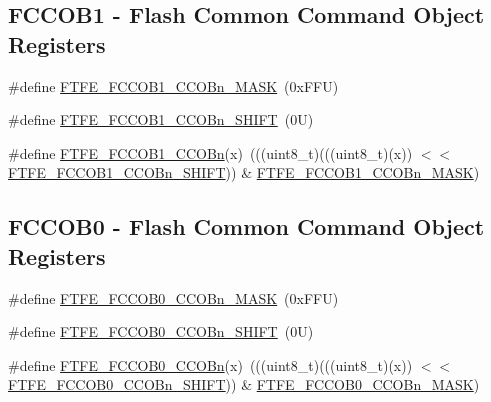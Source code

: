 \subsection*{F\+C\+C\+O\+B1 -\/ Flash Common Command Object Registers}
\begin{DoxyCompactItemize}
\item 
\#define \mbox{\hyperlink{group___f_t_f_e___register___masks_gaa7e9e9a1c18414790702792750daec89}{F\+T\+F\+E\+\_\+\+F\+C\+C\+O\+B1\+\_\+\+C\+C\+O\+Bn\+\_\+\+M\+A\+SK}}~(0x\+F\+F\+U)
\item 
\#define \mbox{\hyperlink{group___f_t_f_e___register___masks_gaf6829788ff3fed81b298ec16ac8346b2}{F\+T\+F\+E\+\_\+\+F\+C\+C\+O\+B1\+\_\+\+C\+C\+O\+Bn\+\_\+\+S\+H\+I\+FT}}~(0\+U)
\item 
\#define \mbox{\hyperlink{group___f_t_f_e___register___masks_ga74880c143b88606490751371eec37818}{F\+T\+F\+E\+\_\+\+F\+C\+C\+O\+B1\+\_\+\+C\+C\+O\+Bn}}(x)~(((uint8\+\_\+t)(((uint8\+\_\+t)(x)) $<$$<$ \mbox{\hyperlink{group___f_t_f_e___register___masks_gaf6829788ff3fed81b298ec16ac8346b2}{F\+T\+F\+E\+\_\+\+F\+C\+C\+O\+B1\+\_\+\+C\+C\+O\+Bn\+\_\+\+S\+H\+I\+FT}})) \& \mbox{\hyperlink{group___f_t_f_e___register___masks_gaa7e9e9a1c18414790702792750daec89}{F\+T\+F\+E\+\_\+\+F\+C\+C\+O\+B1\+\_\+\+C\+C\+O\+Bn\+\_\+\+M\+A\+SK}})
\end{DoxyCompactItemize}
\subsection*{F\+C\+C\+O\+B0 -\/ Flash Common Command Object Registers}
\begin{DoxyCompactItemize}
\item 
\#define \mbox{\hyperlink{group___f_t_f_e___register___masks_ga7499ddf982938188b06763fed98527fa}{F\+T\+F\+E\+\_\+\+F\+C\+C\+O\+B0\+\_\+\+C\+C\+O\+Bn\+\_\+\+M\+A\+SK}}~(0x\+F\+F\+U)
\item 
\#define \mbox{\hyperlink{group___f_t_f_e___register___masks_gadb81c85946e5b09d2a0a47521b4e2f04}{F\+T\+F\+E\+\_\+\+F\+C\+C\+O\+B0\+\_\+\+C\+C\+O\+Bn\+\_\+\+S\+H\+I\+FT}}~(0\+U)
\item 
\#define \mbox{\hyperlink{group___f_t_f_e___register___masks_gaaaa890e477149e64e0a8168cf1b06fbe}{F\+T\+F\+E\+\_\+\+F\+C\+C\+O\+B0\+\_\+\+C\+C\+O\+Bn}}(x)~(((uint8\+\_\+t)(((uint8\+\_\+t)(x)) $<$$<$ \mbox{\hyperlink{group___f_t_f_e___register___masks_gadb81c85946e5b09d2a0a47521b4e2f04}{F\+T\+F\+E\+\_\+\+F\+C\+C\+O\+B0\+\_\+\+C\+C\+O\+Bn\+\_\+\+S\+H\+I\+FT}})) \& \mbox{\hyperlink{group___f_t_f_e___register___masks_ga7499ddf982938188b06763fed98527fa}{F\+T\+F\+E\+\_\+\+F\+C\+C\+O\+B0\+\_\+\+C\+C\+O\+Bn\+\_\+\+M\+A\+SK}})
\end{DoxyCompactItemize}
